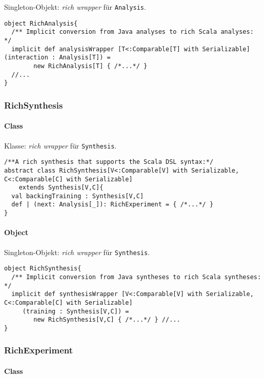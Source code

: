 \documentclass[abstracton, 12pt]{scrartcl}
\begin{document}
Singleton-Objekt: \emph{rich wrapper} für \lstinline!Analysis!.

\begin{lstlisting}
object RichAnalysis{
  /** Implicit conversion from Java analyses to rich Scala analyses: */
  implicit def analysisWrapper [T<:Comparable[T] with Serializable] (interaction : Analysis[T]) = 
        new RichAnalysis[T] { /*...*/ } 
  //...
}
\end{lstlisting}

\subsubsection{RichSynthesis}

\paragraph{Class}

Klasse: \emph{rich wrapper} für \lstinline!Synthesis!.

\begin{lstlisting}
/**A rich synthesis that supports the Scala DSL syntax:*/
abstract class RichSynthesis[V<:Comparable[V] with Serializable, C<:Comparable[C] with Serializable] 
    extends Synthesis[V,C]{
  val backingTraining : Synthesis[V,C]
  def | (next: Analysis[_]): RichExperiment = { /*...*/ }
}
\end{lstlisting}

\paragraph{Object}

Singleton-Objekt: \emph{rich wrapper} für \lstinline!Synthesis!.

\begin{lstlisting}
object RichSynthesis{
  /** Implicit conversion from Java syntheses to rich Scala syntheses: */
  implicit def synthesisWrapper [V<:Comparable[V] with Serializable, C<:Comparable[C] with Serializable] 
     (training : Synthesis[V,C]) =
        new RichSynthesis[V,C] { /*...*/ } //...
}    
\end{lstlisting}

\subsubsection{RichExperiment}

\paragraph{Class}
\end{document}
